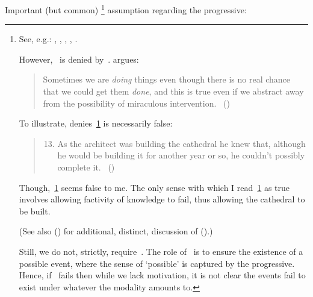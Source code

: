 \begin{note}
  Important (but common)%
  \footnote{
    See, e.g.:
    \cite{Bennett:1972uw},
    \cite{Dowty:1979vq},
    \cite{Parsons:1990aa},
    \cite{Landman:1992wh},
    \cite{Portner:1998um}.

    However,~ is denied by~\textcite{Szabo:2004ul}.
    \citeauthor{Szabo:2004ul} argues:
    \begin{quote}
      Sometimes we are \emph{doing} things even though there is no real chance that we could get them \emph{done}, and this is true even if we abstract away from the possibility of miraculous intervention.%
      \mbox{ }\hfill\mbox{(\citeyear[40]{Szabo:2004ul})}
    \end{quote}
    To illustrate, \citeauthor{Szabo:2004ul} denies~\ref{Szabo:Arch} is necessarily false:
    \begin{quote}
      \begin{enumerate}[label=(\arabic*), ref=(\arabic*)]
        \setcounter{enumi}{12}
      \item
        \label{Szabo:Arch}
        As the architect was building the cathedral he knew that, although he would be building it for another year or so, he couldn't possibly complete it.%
        \mbox{ }\hfill\mbox{(\citeyear[38]{Szabo:2004ul})}
      \end{enumerate}
    \end{quote}
    Though,~\ref{Szabo:Arch} seems false to me.
    The only sense with which I read~\ref{Szabo:Arch} as true involves allowing factivity of knowledge to fail, thus allowing the cathedral to be built.

    (See also (\cite[1245]{Portner:2011vi}) for additional, distinct, discussion of (\cite{Szabo:2004ul}).)

    Still, we do not, strictly, require~.
    The role of~ is to ensure the existence of a possible event, where the sense of `possible' is captured by the progressive.
    Hence, if~ fails then while we lack motivation, it is not clear the events fail to exist under whatever the modality amounts to.
  }
  assumption regarding the progressive:


\end{note}
